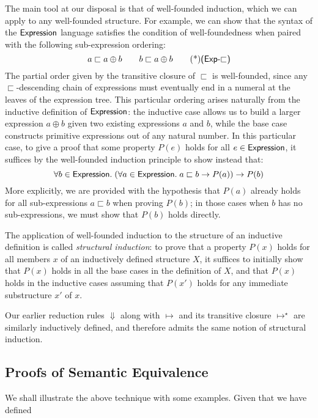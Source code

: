 \def\subExp{\sqsubset}

The main tool at our disposal is that of well-founded induction, which we
can apply to any well-founded structure. For example, we can show that the
syntax of the $\mathsf{Expression}$ language satisfies the condition of
well-foundedness when paired with the following sub-expression ordering:
\[
	a \subExp a \oplus b \qquad b \subExp a \oplus b \eqTag{Exp-$\subExp$}
\]
The partial order given by the transitive closure of $\subExp$ is
well-founded, since any $\subExp$-descending chain of expressions must
eventually end in a numeral at the leaves of the expression tree. This
particular ordering arises naturally from the inductive definition of
$\mathsf{Expression}$: the inductive case  allows us to build
a larger expression $a \oplus b$ given two existing expressions $a$ and $b$,
while the base case  constructs primitive
expressions out of any natural number. In this particular case, to give
a proof that some property $P(e)$ holds for all $e \in \mathsf{Expression}$, it
suffices by the well-founded induction principle to show instead that:
\[
	\forall b \in \Expression.\;
		(\forall a \in \Expression.\; a \subExp b \rightarrow P(a))
		\rightarrow P(b)
\]
More explicitly, we are provided with the hypothesis that $P(a)$ already
holds for all sub-expressions $a \subExp b$ when proving $P(b)$; in those
cases when $b$ has no sub-expressions, we must show that $P(b)$ holds
directly.

The application of well-founded induction to the structure of an inductive
definition is called \emph{structural induction}: to prove that a property
$P(x)$ holds for all members $x$ of an inductively defined structure $X$, it
suffices to initially show that $P(x)$ holds in all the base cases in the
definition of $X$, and that $P(x)$ holds in the inductive cases assuming
that $P(x')$ holds for any immediate substructure $x'$ of $x$.

Our earlier reduction rules ${\Downarrow}$ along with ${\mapsto}$ and its
transitive closure ${\mapsto^\star}$ are similarly inductively defined, and
therefore admits the same notion of structural induction.


\subsection{Proofs of Semantic Equivalence}%

We shall illustrate the above technique with some examples. Given that we
have defined 

